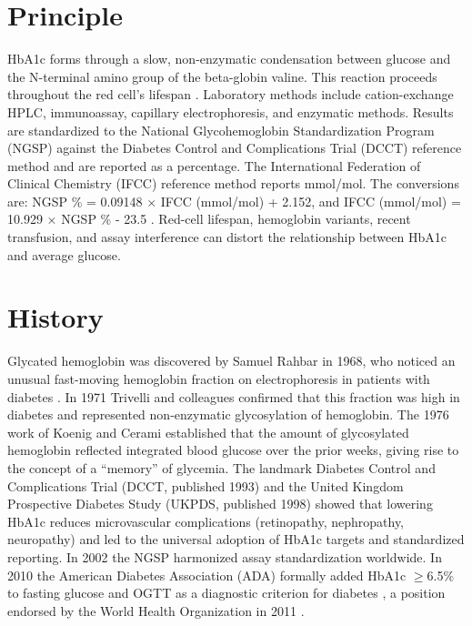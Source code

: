\section*{Principle}
HbA1c forms through a slow, non-enzymatic condensation between glucose and the N-terminal amino group of the beta-globin valine. This reaction proceeds throughout the red cell's lifespan \cite{tietz2023textbook}. Laboratory methods include cation-exchange HPLC, immunoassay, capillary electrophoresis, and enzymatic methods. Results are standardized to the National Glycohemoglobin Standardization Program (NGSP) against the Diabetes Control and Complications Trial (DCCT) reference method and are reported as a percentage. The International Federation of Clinical Chemistry (IFCC) reference method reports mmol/mol. The conversions are: NGSP \% = 0.09148 $\times$ IFCC (mmol/mol) + 2.152, and IFCC (mmol/mol) = 10.929 $\times$ NGSP \% - 23.5 \cite{little2011status}. Red-cell lifespan, hemoglobin variants, recent transfusion, and assay interference can distort the relationship between HbA1c and average glucose.

\section*{History}
Glycated hemoglobin was discovered by Samuel Rahbar in 1968, who noticed an unusual fast-moving hemoglobin fraction on electrophoresis in patients with diabetes \cite{rahbar1968abnormal}. In 1971 Trivelli and colleagues confirmed that this fraction was high in diabetes and represented non-enzymatic glycosylation of hemoglobin. The 1976 work of Koenig and Cerami established that the amount of glycosylated hemoglobin reflected integrated blood glucose over the prior weeks, giving rise to the concept of a ``memory'' of glycemia. The landmark Diabetes Control and Complications Trial (DCCT, published 1993) \cite{dcct1993effect} and the United Kingdom Prospective Diabetes Study (UKPDS, published 1998) \cite{ukpds1998intensive} showed that lowering HbA1c reduces microvascular complications (retinopathy, nephropathy, neuropathy) and led to the universal adoption of HbA1c targets and standardized reporting. In 2002 the NGSP harmonized assay standardization worldwide. In 2010 the American Diabetes Association (ADA) formally added HbA1c $\geq$6.5\% to fasting glucose and OGTT as a diagnostic criterion for diabetes \cite{ada2023standards}, a position endorsed by the World Health Organization in 2011 \cite{who2011glycated}.

